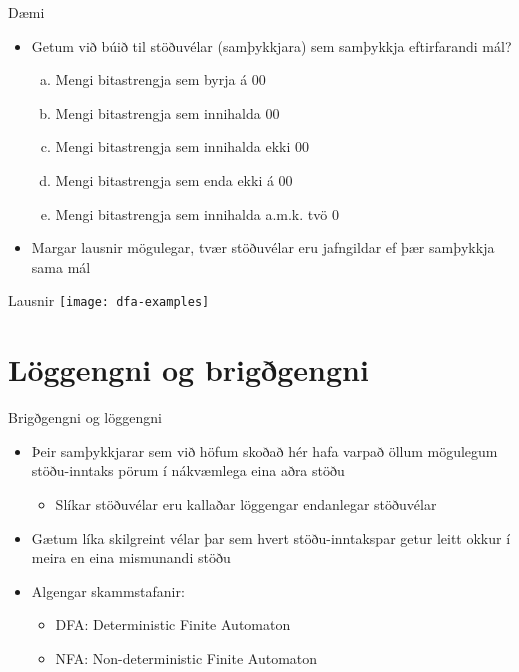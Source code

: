 \documentclass[handout]{beamer}
\begin{document}
\begin{frame}{Dæmi}
    \begin{itemize}
        \item Getum við búið til stöðuvélar (samþykkjara) sem samþykkja eftirfarandi mál?
        \begin{enumerate}[a)]
            \item Mengi bitastrengja sem byrja á 00
            \item Mengi bitastrengja sem innihalda 00
            \item Mengi bitastrengja sem innihalda ekki 00
            \item Mengi bitastrengja sem enda ekki á 00
            \item Mengi bitastrengja sem innihalda a.m.k. tvö 0
        \end{enumerate}
        \item Margar lausnir mögulegar, tvær stöðuvélar eru jafngildar ef þær samþykkja sama mál
    \end{itemize}
\end{frame}

\begin{frame}{Lausnir}
    \texttt{[image: dfa-examples]}
\end{frame}

\section{Löggengni og brigðgengni}

\begin{frame}{Brigðgengni og löggengni}
    \begin{itemize}
        \item Þeir samþykkjarar sem við höfum skoðað hér hafa varpað öllum mögulegum stöðu-inntaks pörum í nákvæmlega eina aðra stöðu
        \begin{itemize}
            \item Slíkar stöðuvélar eru kallaðar löggengar endanlegar stöðuvélar
        \end{itemize}
        \item Gætum líka skilgreint vélar þar sem hvert stöðu-inntakspar getur leitt okkur í meira en eina mismunandi stöðu
        \item Algengar skammstafanir:
        \begin{itemize}
            \item DFA: Deterministic Finite Automaton
            \item NFA: Non-deterministic Finite Automaton
        \end{itemize}
    \end{itemize}
\end{frame}
\end{document}

